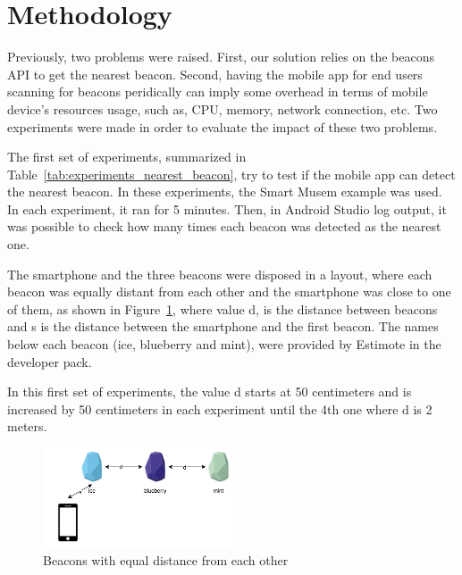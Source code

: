 \section{Methodology}
\label{sec:methodology}
Previously, two problems were raised. First, our solution relies on the beacons \gls{API} to get the nearest beacon. Second, having the mobile app for end users scanning for beacons peridically can imply some overhead in terms of mobile device's resources usage, such as, \gls{CPU}, memory, network connection, etc.
Two experiments were made in order to evaluate the impact of these two problems.

The first set of experiments, summarized in Table~\ref{tab:experiments_nearest_beacon}, try to test if the mobile app can detect the nearest beacon.
In these experiments, the Smart Musem example was used.
In each experiment, it ran for 5 minutes. Then, in Android Studio log output, it was possible to check how many times each beacon was detected as the nearest one.



The smartphone and the three beacons were disposed in a layout, where each beacon was equally distant from each other and the smartphone was close to one of them, as shown in Figure~\ref{fig:experiments_nearest_beacon}, where value d, is the distance between beacons and s is the distance between the smartphone and the first beacon. The names below each beacon (ice, blueberry and mint), were provided by Estimote in the developer pack.

In this first set of experiments, the value d starts at 50 centimeters and is increased by 50 centimeters in each experiment until the 4th one where d is 2 meters.

\begin{figure}[!ht]
  \centering
    \includegraphics[width=0.5\textwidth, keepaspectratio]{images/nearest_beacon}
    \caption{Beacons with equal distance from each other}
    \label{fig:experiments_nearest_beacon}
\end{figure}

